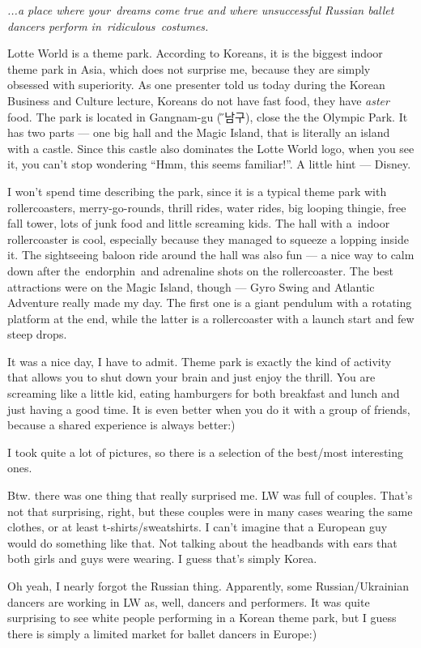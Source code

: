 \begin{post}
	\begin{content}
\textit{...a place where your dreams come true and where unsuccessful Russian ballet dancers perform in ridiculous costumes.}

Lotte World is a theme park. According to Koreans, it is the biggest indoor theme park in Asia, which does not surprise me, because they are simply obsessed with superiority. As one presenter told us today during the Korean Business and Culture lecture, Koreans do not have fast food, they have \textit{aster} food. The park is located in Gangnam-gu ({\H 강남구}), close the the Olympic Park. It has two parts — one big hall and the Magic Island, that is literally an island with a castle. Since this castle also dominates the Lotte World logo, when you see it, you can't stop wondering ``Hmm, this seems familiar!''. A little hint — Disney.

I won't spend time describing the park, since it is a typical theme park with rollercoasters, merry-go-rounds, thrill rides, water rides, big looping thingie, free fall tower, lots of junk food and little screaming kids. The hall with a indoor rollercoaster is cool, especially because they managed to squeeze a lopping inside it. The sightseeing baloon ride around the hall was also fun — a nice way to calm down after the endorphin and adrenaline shots on the rollercoaster. The best attractions were on the Magic Island, though — Gyro Swing and Atlantic Adventure really made my day. The first one is a giant pendulum with a rotating platform at the end, while the latter is a rollercoaster with a launch start and few steep drops.

It was a nice day, I have to admit. Theme park is exactly the kind of activity that allows you to shut down your brain and just enjoy the thrill. You are screaming like a little kid, eating hamburgers for both breakfast and lunch and just having a good time. It is even better when you do it with a group of friends, because a shared experience is always better:)

I took quite a lot of pictures, so there is a selection of the best/most interesting ones.


Btw. there was one thing that really surprised me. LW was full of couples. That's not that surprising, right, but these couples were in many cases wearing the same clothes, or at least t-shirts/sweatshirts. I can't imagine that a European guy would do something like that. Not talking about the headbands with ears that both girls and guys were wearing. I guess that's simply Korea.

Oh yeah, I nearly forgot the Russian thing. Apparently, some Russian/Ukrainian dancers are working in LW as, well, dancers and performers. It was quite surprising to see white people performing in a Korean theme park, but I guess there is simply a limited market for ballet dancers in Europe:)
	\end{content}
\end{post}
